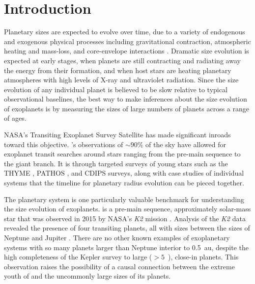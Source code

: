 \documentclass[twocolumn]{aastex631}
\begin{document}

\section{Introduction}


Planetary sizes are expected to evolve over time, due to a variety of endogenous and exogenous physical processes including gravitational contraction, atmospheric heating and mass-loss, and core-envelope interactions \citep[e.g.][]{OwenWu2013, Lopez2013, Jin2014, ChenRogers2016, Ginzburg2018}. Dramatic size evolution is expected at early stages, when planets are still contracting and radiating away the energy from their formation, and when host stars are heating planetary atmospheres with high levels of X-ray and ultraviolet radiation. Since the size evolution of any individual planet is believed to be slow relative to typical observational baselines, the best way to make inferences about the size evolution of exoplanets is by measuring the sizes of large numbers of planets across a range of ages. 

NASA's Transiting Exoplanet Survey Satellite \citep[TESS,][]{Ricker2015} has made significant inroads toward this objective. \tess's observations of $\sim 90 \%$ of the sky have allowed for exoplanet transit searches around stars ranging from the pre-main sequence to the giant branch. It is through targeted surveys of young stars such as the THYME \citep[e.g.][]{Newton2019}, PATHOS \citep[e.g.][]{Nardiello2020}, and CDIPS \citep[e.g.][]{Bouma2020} surveys, along with case studies of individual systems \citep[e.g.][]{benatti19, Plavchan2020, Hedges2021, Zhou2021} that the timeline for planetary radius evolution can be pieced together. 

The \sname planetary system is one particularly valuable benchmark for understanding the size evolution of exoplanets. \sname is a pre-main sequence, approximately solar-mass star that was observed in 2015 by NASA's \textit{K2} mission \citep{Howell2014}. Analysis of the \textit{K2} data revealed the presence of four transiting planets, all with sizes between the sizes of Neptune and Jupiter \citep{David2019a, David2019b}. There are no other known examples of exoplanetary systems with so many planets larger than Neptune interior to 0.5~au, despite the high completeness of the Kepler survey to large ($>5$~\rearth), close-in planets. This observation raises the possibility of a causal connection between the extreme youth of \sname and the uncommonly large sizes of its planets.  
\end{document}
